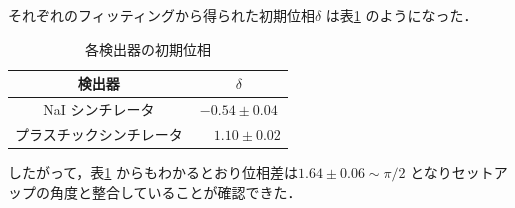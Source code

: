 それぞれのフィッティングから得られた初期位相$\delta$ は表\ref{tab:InitPhases} のようになった．

\begin{table}[h]
	\centering
	\caption{各検出器の初期位相}
	\begin{tabular}{cc}\toprule
	検出器 & $\delta$ \\ \midrule
	NaI シンチレータ & $-0.54 \pm 0.04$ \\
	プラスチックシンチレータ & $\phantom{-}1.10 \pm 0.02$ \\ \bottomrule
	\end{tabular}\label{tab:InitPhases}
\end{table}%
したがって，表\ref{tab:InitPhases} からもわかるとおり位相差は$1.64 \pm 0.06 \sim \pi / 2$ となりセットアップの角度と整合していることが確認できた．



%
